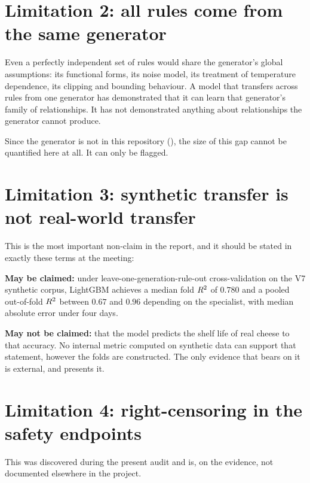 \section{Limitation 2: all rules come from the same generator}

Even a perfectly independent set of rules would share the generator's
global assumptions: its functional forms, its noise model, its treatment of
temperature dependence, its clipping and bounding behaviour. A model that
transfers across rules from one generator has demonstrated that it can
learn that generator's family of relationships. It has not demonstrated
anything about relationships the generator cannot produce.

Since the generator is not in this repository (),
the size of this gap cannot be quantified here at all. It can only be
flagged.

\section{Limitation 3: synthetic transfer is not real-world transfer}

This is the most important non-claim in the report, and it should be stated
in exactly these terms at the meeting:

\begin{findingbox}[title={The claim that may be made, and the one that may not}]
\textbf{May be claimed:} under leave-one-generation-rule-out
cross-validation on the V7 synthetic corpus, LightGBM achieves a median
fold $R^2$ of $0.780$ and a pooled out-of-fold $R^2$ between $0.67$ and
$0.96$ depending on the specialist, with median absolute error under four
days.

\textbf{May not be claimed:} that the model predicts the shelf life of
real cheese to that accuracy. No internal metric computed on synthetic
data can support that statement, however the folds are constructed. The
only evidence that bears on it is external, and 
presents it.
\end{findingbox}

\section{Limitation 4: right-censoring in the safety endpoints}
\label{sec:censoring}

This was discovered during the present audit and is, on the evidence, not
documented elsewhere in the project.

